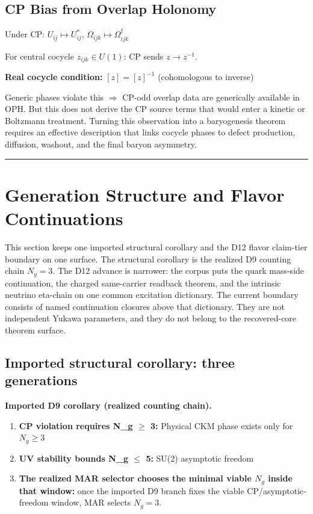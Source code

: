 \subsection{CP Bias from Overlap Holonomy}\label{114-cp-bias-from-overlap-holonomy}

Under CP: \(U_{ij} \mapsto U_{ij}^*\), \(\Omega_{ijk} \mapsto \Omega_{ijk}^\dagger\)

For central cocycle \(z_{ijk} \in U(1)\): CP sends \(z \to z^{-1}\).

\textbf{Real cocycle condition:} \([z] = [z]^{-1}\) (cohomologous to inverse)

Generic phases violate this \(\Rightarrow\) CP-odd overlap data are generically available in OPH. But this does not derive the CP source terms that would enter a kinetic or Boltzmann treatment. Turning this observation into a baryogenesis theorem requires an effective description that links cocycle phases to defect production, diffusion, washout, and the final baryon asymmetry.

\begin{center}\rule{0.5\linewidth}{0.5pt}\end{center}

\section{Generation Structure and Flavor Continuations}\label{12-generation-structure-and-yukawa-hierarchy}

This section keeps one imported structural corollary and the D12 flavor claim-tier boundary on one surface. The structural corollary is the realized D9 counting chain \(N_g=3\). The D12 advance is narrower: the corpus puts the quark mass-side continuation, the charged same-carrier readback theorem, and the intrinsic neutrino eta-chain on one common excitation dictionary. The current boundary consists of named continuation closures above that dictionary. They are not independent Yukawa parameters, and they do not belong to the recovered-core theorem surface.

\subsection{Imported structural corollary: three generations}\label{121-why-three-generations}

\textbf{Imported D9 corollary (realized counting chain).}

\begin{enumerate}
\def\labelenumi{\arabic{enumi}.}
\tightlist
\item
 \textbf{CP violation requires N\_g \ensuremath{\geq} 3:} Physical CKM phase exists only for \(N_g \geq 3\)
\item
 \textbf{UV stability bounds N\_g \ensuremath{\leq} 5:} SU(2) asymptotic freedom
\item
 \textbf{The realized MAR selector chooses the minimal viable \(N_g\) inside that window:} once the imported D9 branch fixes the viable CP/asymptotic-freedom window, MAR selects \(N_g=3\).
\end{enumerate}

